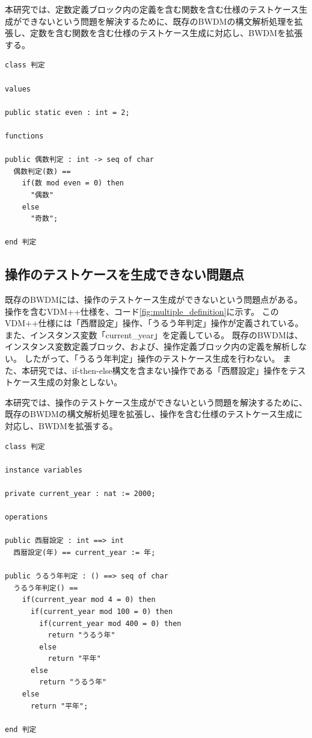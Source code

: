 \documentclass[uplatex, report, a4j, 10pt]{jsbook}
\newcommand{\tool}{BWDM}
\begin{document}
本研究では、定数定義ブロック内の定義を含む関数を含む仕様のテストケース生成ができないという問題を解決するために、既存の\tool{}の構文解析処理を拡張し、定数を含む関数を含む仕様のテストケース生成に対応し、\tool{}を拡張する。

\lstset{language=}
\noindent\begin{minipage}{\textwidth}
  \begin{lstlisting}[caption=定数を含む関数を含むVDM++仕様,label=fig:value_definition]
class 判定

values

public static even : int = 2;

functions

public 偶数判定 : int -> seq of char
  偶数判定(数) ==
    if(数 mod even = 0) then
      "偶数"
    else
      "奇数";

end 判定
\end{lstlisting}
\end{minipage}

\subsection{操作のテストケースを生成できない問題点}\label{sec:probrem_operation}
既存の\tool{}には、操作のテストケース生成ができないという問題点がある。
操作を含むVDM++仕様を、コード\ref{fig:multiple_definition}に示す。
このVDM++仕様には「西暦設定」操作、「うるう年判定」操作が定義されている。
また、インスタンス変数「current\_year」を定義している。
既存のBWDMは、インスタンス変数定義ブロック、および、操作定義ブロック内の定義を解析しない。
したがって、「うるう年判定」操作のテストケース生成を行わない。
また、本研究では、if-then-else構文を含まない操作である「西暦設定」操作をテストケース生成の対象としない。

本研究では、操作のテストケース生成ができないという問題を解決するために、既存の\tool{}の構文解析処理を拡張し、操作を含む仕様のテストケース生成に対応し、\tool{}を拡張する。

\lstset{language=}
\noindent\begin{minipage}{\textwidth}
  \begin{lstlisting}[caption=操作を含むVDM++仕様,label=fig:multiple_definition]
class 判定

instance variables

private current_year : nat := 2000;

operations

public 西暦設定 : int ==> int
  西暦設定(年) == current_year := 年;

public うるう年判定 : () ==> seq of char
  うるう年判定() ==
    if(current_year mod 4 = 0) then
      if(current_year mod 100 = 0) then
        if(current_year mod 400 = 0) then
          return "うるう年"
        else
          return "平年"
      else
        return "うるう年"
    else
      return "平年";

end 判定
\end{lstlisting}
\end{minipage}
\end{document}
